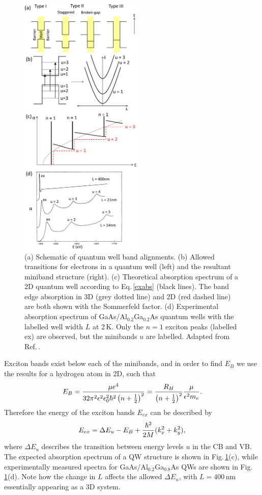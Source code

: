\begin{figure}[h!] 
\centering    
\includegraphics[width=0.53\textwidth]{Fig2}
\caption{(a) Schematic of quantum well band alignments. (b) Allowed transitions for electrons in a quantum well (left) and the resultant miniband structure (right). (c) Theoretical absorption spectrum of a 2D quantum well according to Eq.\,\ref{exabs} (black lines). The band edge absorption in 3D (grey dotted line) and 2D (red dashed line) are both shown with the Sommerfeld factor. (d) Experimental absorption spectrum of GaAs/Al$_{0.2}$Ga$_{0.2}$As quantum wells with the labelled well width $L$ at 2\,K. Only the $n=1$ exciton peaks (labelled ex) are observed, but the minibands $u$ are labelled. Adapted from Ref.\,\cite{Dingle1974}.}
\label{2Fig2}
\end{figure}

Exciton bands exist below each of the minibands, and in order to find $E_B$ we use the results for a hydrogen atom in 2D, such that
\begin{equation}
\centering
E_B =\frac{\mu e^4}{32\pi^2\epsilon^2\epsilon_0^2\hbar^2\left(n+\frac{1}{2}\right)^2} = \frac{R_H}{\left(n+\frac{1}{2}\right)^2}\frac{\mu}{\epsilon^2 m_e} .
\label{exbinding2D}
\end{equation}
Therefore the energy of the exciton bands $E_{ex}$ can be described by
\begin{equation}
\centering
E_{ex} = \Delta E_u - E_B + \frac{\hbar^2}{2M}(k_x^2+k_y^2) ,
\label{exenergy2D}
\end{equation}
where $\Delta E_u$ describes the transition between energy levels $u$ in the CB and VB. The expected absorption spectrum of a QW structure is shown in Fig.\,\ref{2Fig2}(c), while experimentally measured spectra for GaAs/Al$_{0.2}$Ga$_{0.8}$As QWs are shown in Fig.\,\ref{2Fig2}(d). Note how the change in $L$ affects the allowed $\Delta E_u$, with $L=400$\,nm essentially appearing as a 3D system.

